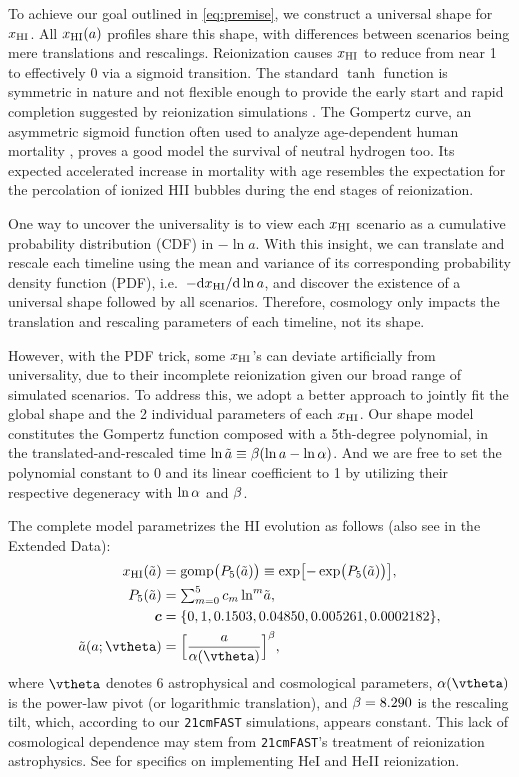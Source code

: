 To achieve our goal outlined in \cref{eq:premise}, we construct a
universal shape for $x_{\mathrm{HI}}$.
All $x_{\mathrm{HI}}(a)$ profiles share this shape, with differences between
scenarios being mere translations and rescalings.
Reionization causes $x_{\mathrm{HI}}$ to reduce from near 1 to effectively 0 via a
sigmoid transition.
The standard $\tanh$ function is symmetric in nature and not flexible
enough to provide the early start and rapid completion suggested by
reionization simulations \cite{Trac2018, Doussot2019}.
The Gompertz curve, an asymmetric sigmoid function often used to analyze
age-dependent human mortality \cite{Gompertz1825}, proves a good model
the survival of neutral hydrogen too.
Its expected accelerated increase in mortality with age resembles the
expectation for the percolation of ionized HII bubbles during the end
stages of reionization.

One way to uncover the universality is to view each $x_{\mathrm{HI}}$ scenario as
a cumulative probability distribution (CDF) in $- \ln a$.
With this insight, we can translate and rescale each timeline using the
mean and variance of its corresponding probability density function
(PDF), i.e.\ $- \mathrm{d}x_{\mathrm{HI}} / \mathrm{d}\ln a$, and discover the
existence of a universal shape followed by all scenarios.
Therefore, cosmology only impacts the translation and rescaling
parameters of each timeline, not its shape.

However, with the PDF trick, some $x_{\mathrm{HI}}$'s can deviate artificially
from universality, due to their incomplete reionization given our broad
range of simulated scenarios.
To address this, we adopt a better approach to jointly fit the global
shape and the 2 individual parameters of each $x_{\mathrm{HI}}$.
Our shape model constitutes the Gompertz function composed with a
5th-degree polynomial, in the translated-and-rescaled time $\ln\tilde{a}
\equiv \beta (\ln a - \ln\alpha)$.
And we are free to set the polynomial constant to 0 and its linear
coefficient to 1 by utilizing their respective degeneracy with $\ln\alpha$
and $\beta$.

The complete model parametrizes the HI evolution as follows (also see
 in the Extended Data):
%
\begin{align}
\label{eq:uni}
x_\HI(\ar) &= \gomp\bigl( P_5(\ar) \bigr)
  \equiv \exp\bigl[ - \exp\bigl( P_5(\ar) \bigr) \bigr], \\
%
\label{eq:poly}
P_5(\ar) &= {\textstyle\sum}_{m=0}^5 \, c_m \ln^m\!\ar, \\
%
\bm{c} &= \{0, 1, 0.1503, 0.04850, 0.005261, 0.0002182\}, \nonumber\\
%
\label{eq:map}
\ar(a; \vtheta) &= \Bigl[ \frac{a}{\ap(\vtheta)} \Bigr]^\tilt,
\end{align}
%
where $\vtheta$ denotes 6 astrophysical and cosmological parameters,
$\ap(\vtheta)$ is the power-law pivot (or logarithmic translation), and
$\beta = 8.290$ is the rescaling tilt, which, according to our
\texttt{21cmFAST} simulations, appears constant.
This lack of cosmological dependence may stem from \texttt{21cmFAST}'s
treatment of reionization astrophysics.
See  for specifics on implementing HeI and HeII
reionization.


